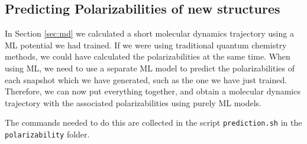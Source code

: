 \documentclass{article}
\begin{document}
\subsection*{Predicting Polarizabilities of new structures}

In Section \ref{sec:md} we calculated a short molecular dynamics trajectory using a ML potential we had trained. If we were using traditional quantum chemistry methods, we could have calculated the polarizabilities at the same time. When using ML, we need to use a separate ML model to predict the polarizabilities of each snapshot which we have generated, such as the one we have just trained. Therefore, we can now put everything together, and obtain a molecular dynamics trajectory with the associated polarizabilities using purely ML models.

The commands needed to do this are collected in the script \verb|prediction.sh| in the \verb|polarizability| folder.
\end{document}

